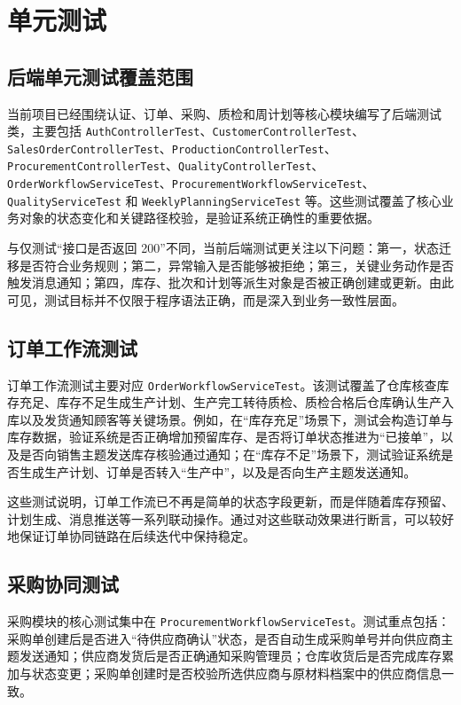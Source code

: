 \section{单元测试}

\subsection{后端单元测试覆盖范围}

当前项目已经围绕认证、订单、采购、质检和周计划等核心模块编写了后端测试类，主要包括 \texttt{AuthControllerTest}、\texttt{CustomerControllerTest}、\texttt{SalesOrderControllerTest}、\texttt{ProductionControllerTest}、\texttt{ProcurementControllerTest}、\texttt{QualityControllerTest}、\texttt{OrderWorkflowServiceTest}、\texttt{ProcurementWorkflowServiceTest}、\texttt{QualityServiceTest} 和 \texttt{WeeklyPlanningServiceTest} 等。这些测试覆盖了核心业务对象的状态变化和关键路径校验，是验证系统正确性的重要依据。

与仅测试“接口是否返回 200”不同，当前后端测试更关注以下问题：第一，状态迁移是否符合业务规则；第二，异常输入是否能够被拒绝；第三，关键业务动作是否触发消息通知；第四，库存、批次和计划等派生对象是否被正确创建或更新。由此可见，测试目标并不仅限于程序语法正确，而是深入到业务一致性层面。

\subsection{订单工作流测试}

订单工作流测试主要对应 \texttt{OrderWorkflowServiceTest}。该测试覆盖了仓库核查库存充足、库存不足生成生产计划、生产完工转待质检、质检合格后仓库确认生产入库以及发货通知顾客等关键场景。例如，在“库存充足”场景下，测试会构造订单与库存数据，验证系统是否正确增加预留库存、是否将订单状态推进为“已接单”，以及是否向销售主题发送库存核验通过通知；在“库存不足”场景下，测试验证系统是否生成生产计划、订单是否转入“生产中”，以及是否向生产主题发送通知。

这些测试说明，订单工作流已不再是简单的状态字段更新，而是伴随着库存预留、计划生成、消息推送等一系列联动操作。通过对这些联动效果进行断言，可以较好地保证订单协同链路在后续迭代中保持稳定。

\subsection{采购协同测试}

采购模块的核心测试集中在 \texttt{ProcurementWorkflowServiceTest}。测试重点包括：采购单创建后是否进入“待供应商确认”状态，是否自动生成采购单号并向供应商主题发送通知；供应商发货后是否正确通知采购管理员；仓库收货后是否完成库存累加与状态变更；采购单创建时是否校验所选供应商与原材料档案中的供应商信息一致。

